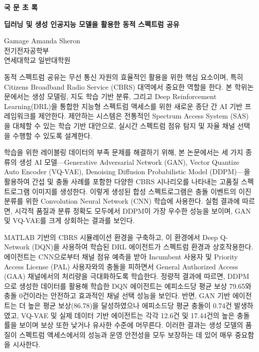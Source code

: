 \clearpage
\begin{flushleft}
    \Large{
        \textbf{국 문 초 록}\\
    }
\vspace{\baselineskip}
\end{flushleft}

\begin{centering}
    \LARGE{
        \textbf{딥러닝 및 생성 인공지능 모델을 활용한 동적 스펙트럼 공유} \\
    }
\vspace{\baselineskip}
\end{centering}


\begin{flushright}
    Gamage Amanda Sheron \\
    전기전자공학부 \\
    연세대학교 일반대학원
\end{flushright}

동적 스펙트럼 공유는 무선 통신 자원의 효율적인 활용을 위한 핵심 요소이며, 특히 Citizens Broadband Radio Service (CBRS) 대역에서 중요한 역할을 한다. 
본 학위논문에서는 생성 모델링, 지도 학습 기반 분류, 그리고 Deep Reinforcement Learning(DRL)을 통합한 지능형 스펙트럼 액세스를 위한 새로운 종단 간 AI 기반 프레임워크를 
제안한다. 제안하는 시스템은 전통적인 Spectrum Access System (SAS)을 대체할 수 있는 학습 기반 대안으로, 실시간 스펙트럼 점유 탐지 및 자율 채널 선택을 
수행할 수 있도록 설계한다.

학습을 위한 레이블링 데이터의 부족 문제를 해결하기 위해, 본 논문에서는 세 가지 종류의 생성 AI 모델—Generative Adversarial Network (GAN), Vector Quantize Auto Encoder (VQ-VAE),
Denoising Diffusion Probabilistic Model (DDPM)—을 활용하여 간섭 및 충돌 사례를 포함한 다양한 CBRS 시나리오를 나타내는 고품질 스펙트로그램 이미지를 생성한다. 이렇게 생성된 
합성 스펙트로그램은 충돌 이벤트의 이진 분류를 위한 Convolution Neural Network (CNN) 학습에 사용한다. 실험 결과에 따르면, 시각적 품질과 분류 정확도 모두에서 DDPM이 가장 우수한 
성능을 보이며, GAN 및 VQ-VAE를 크게 상회하는 결과를 보인다.

MATLAB 기반의 CBRS 시뮬레이션 환경을 구축하고, 이 환경에서 Deep Q- Network (DQN)을 사용하여 학습된 DRL 에이전트가 스펙트럼 환경과 상호작용한다. 에이전트는 CNN으로부터 채널 점유 예측을 
받아 Incumbent 사용자 및 Priority Access License (PAL) 사용자와의 충돌을 피하면서 General Authorized Access (GAA) 채널에서의 처리량을 극대화하도록 학습한다. 정량적 결과에 따르면, 
DDPM으로 생성한 데이터를 활용해 학습한 DQN 에이전트는 에피소드당 평균 보상 79.65와 충돌 0건이라는 안전하고 효과적인 채널 선택 성능을 보인다. 반면, GAN 기반 에이전트는 더 높은 평균 
보상(86.78)을 달성하였으나 에피소드당 평균 충돌이 0.74건 발생하였고, VQ-VAE 및 실제 데이터 기반 에이전트는 각각 12.6건 및 17.44건의 높은 충돌률을 보이며 보상 또한 낮거나 유사한 수준에 
머무른다. 이러한 결과는 생성 모델의 품질이 스펙트럼 액세스에서의 성능과 운영 안전성을 모두 보장하는 데 있어 매우 중요함을 시사한다.

